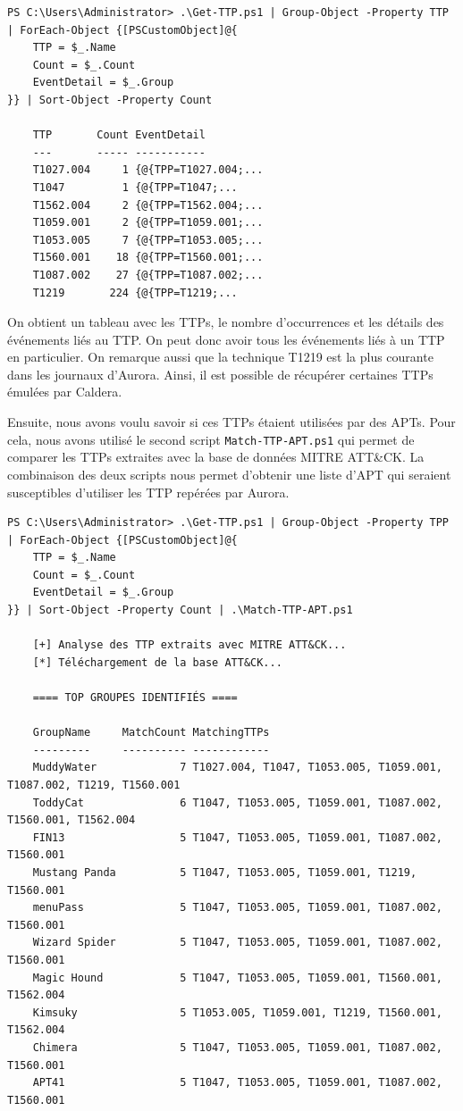 \documentclass[12pt,letterpaper]{article}
\begin{document}
\begin{lstlisting}[caption={Recherche des TTP dans les journaux d'Aurora}, label={lst:ttp_logs}]
PS C:\Users\Administrator> .\Get-TTP.ps1 | Group-Object -Property TTP | ForEach-Object {[PSCustomObject]@{
    TTP = $_.Name
    Count = $_.Count
    EventDetail = $_.Group
}} | Sort-Object -Property Count

    TTP       Count EventDetail
    ---       ----- -----------
    T1027.004     1 {@{TPP=T1027.004;...
    T1047         1 {@{TPP=T1047;...
    T1562.004     2 {@{TPP=T1562.004;...
    T1059.001     2 {@{TPP=T1059.001;...
    T1053.005     7 {@{TPP=T1053.005;...
    T1560.001    18 {@{TPP=T1560.001;...
    T1087.002    27 {@{TPP=T1087.002;...
    T1219       224 {@{TPP=T1219;...
\end{lstlisting}

On obtient un tableau avec les TTPs, le nombre d'occurrences et les détails des événements liés au TTP.
On peut donc avoir tous les événements liés à un TTP en particulier.
On remarque aussi que la technique T1219 est la plus courante dans les journaux d'Aurora.
Ainsi, il est possible de récupérer certaines TTPs émulées par Caldera.

\bigskip

Ensuite, nous avons voulu savoir si ces TTPs étaient utilisées par des APTs.
Pour cela, nous avons utilisé le second script \verb|Match-TTP-APT.ps1| qui permet de comparer les TTPs extraites avec la base de données MITRE ATT\&CK.
La combinaison des deux scripts nous permet d'obtenir une liste d'APT qui seraient susceptibles d'utiliser les TTP repérées par Aurora.
\begin{lstlisting}[caption={Identification des APTs}, label={lst:apt_logs}]
PS C:\Users\Administrator> .\Get-TTP.ps1 | Group-Object -Property TPP | ForEach-Object {[PSCustomObject]@{
    TTP = $_.Name
    Count = $_.Count
    EventDetail = $_.Group
}} | Sort-Object -Property Count | .\Match-TTP-APT.ps1

    [+] Analyse des TTP extraits avec MITRE ATT&CK...
    [*] Téléchargement de la base ATT&CK...

    ==== TOP GROUPES IDENTIFIÉS ====

    GroupName     MatchCount MatchingTTPs
    ---------     ---------- ------------
    MuddyWater             7 T1027.004, T1047, T1053.005, T1059.001, T1087.002, T1219, T1560.001
    ToddyCat               6 T1047, T1053.005, T1059.001, T1087.002, T1560.001, T1562.004
    FIN13                  5 T1047, T1053.005, T1059.001, T1087.002, T1560.001
    Mustang Panda          5 T1047, T1053.005, T1059.001, T1219, T1560.001
    menuPass               5 T1047, T1053.005, T1059.001, T1087.002, T1560.001
    Wizard Spider          5 T1047, T1053.005, T1059.001, T1087.002, T1560.001
    Magic Hound            5 T1047, T1053.005, T1059.001, T1560.001, T1562.004
    Kimsuky                5 T1053.005, T1059.001, T1219, T1560.001, T1562.004
    Chimera                5 T1047, T1053.005, T1059.001, T1087.002, T1560.001
    APT41                  5 T1047, T1053.005, T1059.001, T1087.002, T1560.001
\end{lstlisting}
\end{document}
